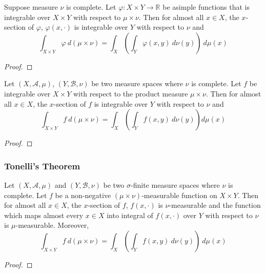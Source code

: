 \begin{theorem}
	Suppose measure $\nu$ is complete.
	Let $\varphi : X \times Y \to \mathbb{R}$ be asimple functions that is integrable over $X \times Y$ with respect to $\mu \times \nu$.
	Then for almost all $x \in X$, the $x$-section of $\varphi$, $\varphi(x,\cdot)$ is integrable over $Y$ with respect to $\nu$ and
	\begin{equation}
		\int_{X \times Y} \varphi \ d(\mu \times \nu) = \int_X \left( \int_Y  \varphi(x,y) \ d\nu(y) \right) \ d\mu(x)
	\end{equation}
\end{theorem}
\begin{proof}
\end{proof}

\begin{theorem}[Fubini]
	Let $(X,\mathcal{A},\mu)$, $(Y,\mathcal{B},\nu)$ be two measure spaces where $\nu$ is complete.
	Let $f$ be integrable over $X \times Y$ with respect to the product measure $\mu \times \nu$.
	Then for almost all $x \in X$, the $x$-section of $f$ is integrable over $Y$ with respect to $\nu$ and
	\begin{equation}
		\int_{X \times Y} f \ d(\mu \times \nu) = \int_X \left( \int_Y f(x,y) \ d\nu(y) \right) d\mu(x)
	\end{equation}
\end{theorem}
\begin{proof}
\end{proof}

\subsubsection{Tonelli's Theorem}
\begin{theorem}[Tonelli]
	Let $(X,\mathcal{A},\mu)$ and $(Y,\mathcal{B},\nu)$ be two $\sigma$-finite measure spaces where $\nu$ is complete.
	Let $f$ be a non-negative $(\mu \times \nu)$-measurable function on $X \times Y$.
	Then for almost all $x \in X$, the $x$-section of $f$, $f(x,\cdot)$ is $\nu$-measurable and the function which maps almost every $x \in X$ into integral of $f(x,\cdot)$ over $Y$ with respect to $\nu$ is $\mu$-measurable.
	Moreover,
	\begin{equation}
		\int_{X \times Y} f \ d(\mu \times \nu) = \int_X \left( \int_Y f(x,y) \ d\nu(y) \right) \ d\mu(x)
	\end{equation}
\end{theorem}
\begin{proof}
\end{proof}

